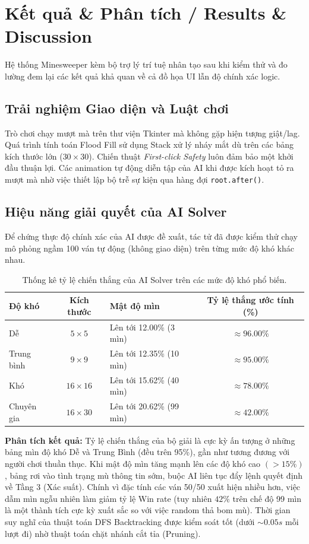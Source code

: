 \section{Kết quả \& Phân tích / Results \& Discussion}

Hệ thống Minesweeper kèm bộ trợ lý trí tuệ nhân tạo sau khi kiểm thử và đo lường đem lại các kết quả khả quan về cả đồ họa UI lẫn độ chính xác logic.

\subsection{Trải nghiệm Giao diện và Luật chơi}
Trò chơi chạy mượt mà trên thư viện Tkinter mà không gặp hiện tượng giật/lag. Quá trình tính toán Flood Fill sử dụng Stack xử lý nháy mắt dù trên các bảng kích thước lớn ($30 \times 30$). Chiến thuật \textit{First-click Safety} luôn đảm bảo một khởi đầu thuận lợi. Các animation tự động diễn tập của AI khi được kích hoạt tỏ ra mượt mà nhờ việc thiết lập bộ trễ sự kiện qua hàng đợi \texttt{root.after()}.

\subsection{Hiệu năng giải quyết của AI Solver}
Để chứng thực độ chính xác của AI được đề xuất, tác tử đã được kiểm thử chạy mô phỏng ngầm 100 ván tự động (không giao diện) trên từng mức độ khó khác nhau.

\begin{table}[H]
    \centering
    \begin{tabularx}{0.9\textwidth}{|l|c|X|c|}
    \hline
    \textbf{Độ khó} & \textbf{Kích thước} & \textbf{Mật độ mìn} & \textbf{Tỷ lệ thắng ước tính (\%)} \\ \hline
    Dễ & $5 \times 5$ & Lên tới 12.00\% (3 mìn) & $\approx 96.00\%$ \\ \hline
    Trung bình & $9 \times 9$ & Lên tới 12.35\% (10 mìn) & $\approx 95.00\%$ \\ \hline
    Khó & $16 \times 16$ & Lên tới 15.62\% (40 mìn) & $\approx 78.00\%$ \\ \hline
    Chuyên gia & $16 \times 30$ & Lên tới 20.62\% (99 mìn) & $\approx 42.00\%$ \\ \hline
    \end{tabularx}
    \caption{Thống kê tỷ lệ chiến thắng của AI Solver trên các mức độ khó phổ biến.}
\end{table}

\textbf{Phân tích kết quả:}
Tỷ lệ chiến thắng của bộ giải là cực kỳ ấn tượng ở những bảng mìn độ khó Dễ và Trung Bình (đều trên 95\%), gần như tương đương với người chơi thuần thục. Khi mật độ mìn tăng mạnh lên các độ khó cao $(> 15\%)$, bảng rơi vào tình trạng mù thông tin sớm, buộc AI liên tục đẩy lệnh quyết định về Tầng 3 (Xác suất). Chính vì đặc tính các ván 50/50 xuất hiện nhiều hơn, việc dẫm mìn ngẫu nhiên làm giảm tỷ lệ Win rate (tuy nhiên $42\%$ trên chế độ 99 mìn là một thành tích cực kỳ xuất sắc so với việc random thả bom mù). Thời gian suy nghĩ của thuật toán DFS Backtracking được kiểm soát tốt (dưới $\sim 0.05s$ mỗi lượt đi) nhờ thuật toán chặt nhánh cắt tỉa (Pruning).
